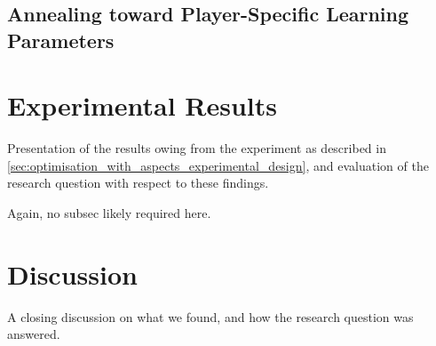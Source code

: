

\subsection{Annealing toward Player-Specific Learning Parameters}






\section{Experimental Results}
\label{sec:optimisation_with_aspects_experimental_results}

Presentation of the results owing from the experiment as described in
\cref{sec:optimisation_with_aspects_experimental_design}, and evaluation of the
research question with respect to these findings.

Again, no subsec likely required here.

\section{Discussion}
\label{sec:optimisation_with_aspects_discussion}

A closing discussion on what we found, and how the research question was
answered.
